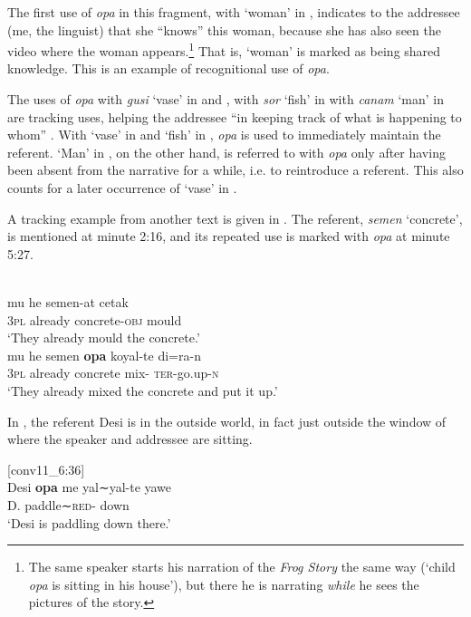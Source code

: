 \documentclass[output=paper,colorlinks,citecolor=brown]{langscibook}
\begin{document}
The first use of \textit{opa} in this fragment, with `woman' in , indicates to the addressee (me, the linguist) that she ``knows'' this woman, because she has also seen the video where the woman appears.\footnote{The same speaker starts his narration of the \textit{Frog Story} \citep{Mayer1969} the same way (`child \textit{opa} is sitting in his house'), but there he is narrating \textit{while} he sees the pictures of the story.} That is, `woman' is marked as being shared knowledge. This is an example of recognitional use of \textit{opa}.

The uses of \textit{opa} with \textit{gusi} `vase' in  and , with \textit{sor} `fish' in  with \textit{canam} `man' in  are tracking uses, helping the addressee ``in keeping track of what is happening to whom'' \citep[226]{Himmelmann1996}. With `vase' in  and `fish' in , \textit{opa} is used to immediately maintain the referent. `Man' in , on the other hand, is referred to with \textit{opa} only after having been absent from the narrative for a while, i.e. to reintroduce a referent. This also counts for a later occurrence of `vase' in .

A tracking example from another text is given in . The referent, \textit{semen} `concrete', is mentioned at minute 2:16, and its repeated use is marked with \textit{opa} at minute 5:27.


\ea \label{exe:semen}	
\ea {[narr7\_2:16]}\\
\gll mu he semen-at cetak\\
\textsc{3pl} already concrete-\textsc{obj} mould\\	
\glt	`They already mould the concrete.'
\ex {[narr7\_5:27]}\\
\gll mu he semen \textbf{opa} koyal-te di=ra-n\\
\textsc{3pl} already concrete {\glopa} mix-{\glte} \textsc{ter}-go.up-\textsc{n}\\	
\glt	`They already mixed the concrete and put it up.' 
\z 
\z 

In , the referent Desi is in the outside world, in fact just outside the window of where the speaker and addressee are sitting.

	\ea	\label{exe:desi} [conv11\_6:36]\\
	\gll Desi \textbf{opa} me yal∼yal-te yawe\\
		D. {\glopa} {\glme} paddle∼\textsc{red}-{\glte} down\\
	\glt 	`Desi is paddling down there.' 
	\z 
\end{document}
